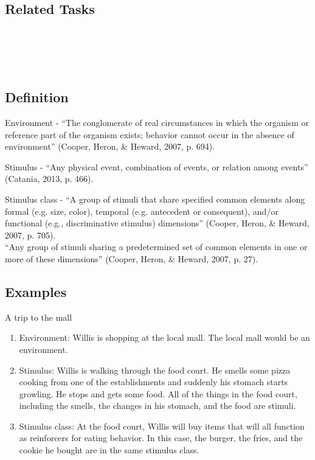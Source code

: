 \subsection{Related Tasks}
\fourFKThirtySix{}\\
\fourgFive{}\\
\fouriOne{}\\
%
%
%
%
%
%
\section{\fourFKEleven{}}
\subsection{Definition}  
Environment - ``The conglomerate of real circumstances in which the organism or reference part of the organism exists; behavior cannot occur in the absence of environment'' (Cooper, Heron, \& Heward, 2007, p. 694).

Stimulus - ``Any physical event, combination of events, or relation among events'' (Catania, 2013, p. 466).  

Stimulus class - ``A group of stimuli that share specified common elements along formal (e.g. size, color), temporal (e.g. antecedent or consequent), and/or functional (e.g., discriminative stimulus) dimensions'' (Cooper, Heron, \& Heward, 2007, p. 705).\\

``Any group of stimuli sharing a predetermined set of common elements in one or more of these dimensions'' (Cooper, Heron, \& Heward, 2007, p. 27).  
\subsection{Examples}
A trip to the mall
\begin{enumerate}
\item  Environment:  Willis is shopping at the local mall. The local mall would be an environment.
\item Stimulus: Willis is walking through the food court.  He smells some pizza cooking from one of the establishments and suddenly his stomach starts growling.  He stops and gets some food.  All of the things in the food court, including the smells, the changes in his stomach, and the food are stimuli.
\item Stimulus class:  At the food court, Willis will buy items that will all function as reinforcers for eating behavior. In this case, the burger, the fries, and the cookie he bought are in the same stimulus class.
%
\end{enumerate}
%
